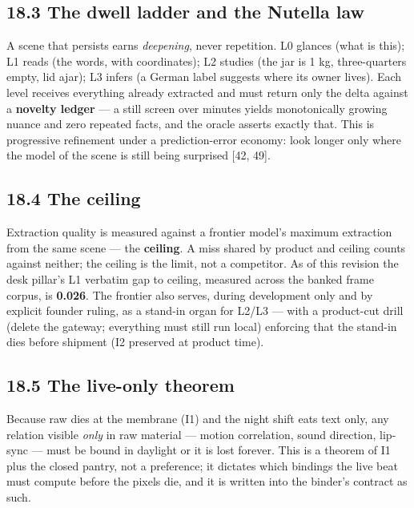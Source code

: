 \subsection{18.3 The dwell ladder and the Nutella law}\label{the-dwell-ladder-and-the-nutella-law}

A scene that persists earns \emph{deepening}, never repetition. L0 glances (what is
this); L1 reads (the words, with coordinates); L2 studies (the jar is 1 kg,
three-quarters empty, lid ajar); L3 infers (a German label suggests where its
owner lives). Each level receives everything already extracted and must return
only the delta against a \textbf{novelty ledger} --- a still screen over minutes
yields monotonically growing nuance and zero repeated facts, and the oracle
asserts exactly that. This is progressive refinement under a prediction-error
economy: look longer only where the model of the scene is still being
surprised {[}42, 49{]}.

\subsection{18.4 The ceiling}\label{the-ceiling}

Extraction quality is measured against a frontier model's maximum extraction
from the same scene --- the \textbf{ceiling}. A miss shared by product and ceiling
counts against neither; the ceiling is the limit, not a competitor. As of this
revision the desk pillar's L1 verbatim gap to ceiling, measured across the
banked frame corpus, is \textbf{0.026}. The frontier also serves, during
development only and by explicit founder ruling, as a stand-in organ for L2/L3
--- with a product-cut drill (delete the gateway; everything must still run
local) enforcing that the stand-in dies before shipment (I2 preserved at
product time).

\subsection{18.5 The live-only theorem}\label{the-live-only-theorem}

Because raw dies at the membrane (I1) and the night shift eats text only, any
relation visible \emph{only} in raw material --- motion correlation, sound direction,
lip-sync --- must be bound in daylight or it is lost forever. This is a theorem
of I1 plus the closed pantry, not a preference; it dictates which bindings the
live beat must compute before the pixels die, and it is written into the
binder's contract as such.

